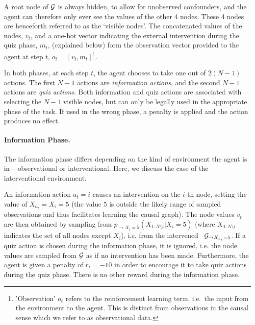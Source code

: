 A root node of ${\cal G}$ is always hidden, to allow for unobserved confounders, and the agent can therefore only ever see the values of the other 4 nodes. These 4 nodes are henceforth referred to as the `visible nodes'. The concatenated values of the nodes, $v_t$, and a one-hot vector indicating the external intervention during the quiz phase, $m_{t}$, (explained below) form the observation vector provided to the agent at step $t$, $o_{t}=[v_{t}, m_{t}]$\footnote{'Observation' $o_{t}$ refers to the reinforcement learning term, i.e.~the input from the environment to the agent. This is distinct from observations in the causal sense which we refer to as observational data.}.

In both phases, at each step $t$, the agent chooses to take one out of $2(N-1)$ actions. The first $N-1$ actions are \emph{information actions}, and the second $N-1$ actions are \emph{quiz actions}. Both information and quiz actions are associated with selecting the $N-1$ visible nodes, but can only be legally used in the appropriate phase of the task. If used in the wrong phase, a penalty is applied and the action produces no effect.

\paragraph{Information Phase.}
The information phase differs depending on the kind of environment the agent is in -- observational or interventional. Here, we discuss the case of the interventional environment.

An information action $a_t = i$ causes an intervention on the $i$-th node, setting the value of $X_{a_t} = X_i = 5$ (the value $5$ is outside the likely range of sampled observations and thus facilitates learning the causal graph). The node values $v_t$ are then obtained by sampling from $p_{\rightarrow X_i=5}(X_{1:N\setminus i }|X_i=5)$ (where $X_{1:N\setminus i }$ indicates the set of all nodes except $X_i$), i.e. from the intervened \CBN~${\cal G}_{\rightarrow X_{a_t}=5}$. 
%
If a quiz action is chosen during the information phase, it is ignored, i.e. the node values are sampled from ${\cal G}$ as if no intervention has been made. Furthermore, the agent is given a penalty of $r_t = -10$ in order to encourage it to take quiz actions during the quiz phase. There is no other reward during the information phase.

